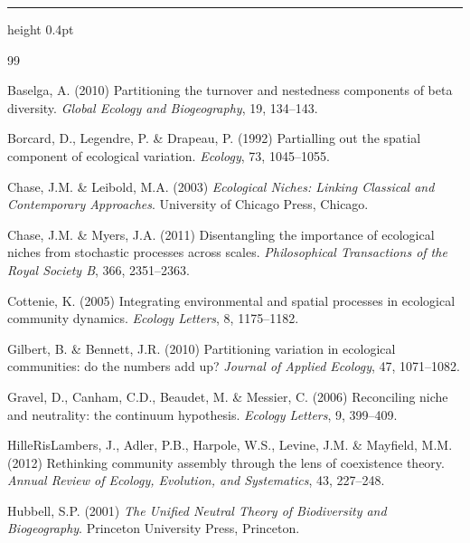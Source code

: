 \documentclass[11pt,a4paper]{article}
\begin{document}
\vspace{8pt}
\hrule height 0.4pt
\vspace{6pt}

\renewcommand{\refname}{\normalsize\sffamily\bfseries References}
\begin{thebibliography}{99}
\small
\setlength{\itemsep}{1pt}

 Baselga, A. (2010) Partitioning the turnover and
nestedness components of beta diversity. \textit{Global Ecology and Biogeography}, 19,
134--143.

 Borcard, D., Legendre, P. \& Drapeau, P.
(1992) Partialling out the spatial component of ecological variation. \textit{Ecology},
73, 1045--1055.

 Chase, J.M. \& Leibold, M.A. (2003)
\textit{Ecological Niches: Linking Classical and Contemporary Approaches}. University of
Chicago Press, Chicago.

 Chase, J.M. \& Myers, J.A. (2011) Disentangling
the importance of ecological niches from stochastic processes across scales.
\textit{Philosophical Transactions of the Royal Society B}, 366, 2351--2363.

 Cottenie, K. (2005) Integrating environmental and
spatial processes in ecological community dynamics. \textit{Ecology Letters}, 8,
1175--1182.

 Gilbert, B. \& Bennett, J.R. (2010)
Partitioning variation in ecological communities: do the numbers add up? \textit{Journal
of Applied Ecology}, 47, 1071--1082.

 Gravel, D., Canham, C.D., Beaudet, M. \&
Messier, C. (2006) Reconciling niche and neutrality: the continuum hypothesis.
\textit{Ecology Letters}, 9, 399--409.

 HilleRisLambers, J., Adler,
P.B., Harpole, W.S., Levine, J.M. \& Mayfield, M.M. (2012) Rethinking community assembly
through the lens of coexistence theory. \textit{Annual Review of Ecology, Evolution, and
Systematics}, 43, 227--248.

 Hubbell, S.P. (2001) \textit{The Unified Neutral
Theory of Biodiversity and Biogeography}. Princeton University Press, Princeton.


\end{thebibliography}
\end{document}
